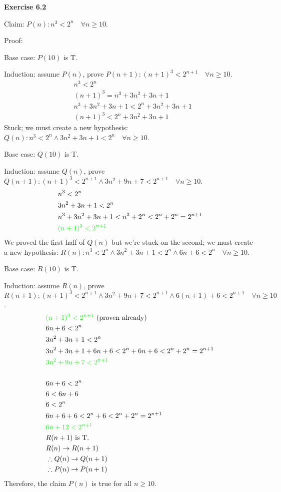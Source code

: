 \documentclass[fleqn]{article}
\begin{document}
\newpage
{\noindent\Large\bf Exercise 6.2}\vspace{1em}\par
Claim: $P(n): n^3 < 2^n\quad \forall n \geq 10$.\par
Proof:
\begin{addmargin}{2em}
	Base case: $P(10)$ is T.\par
	Induction: assume $P(n)$, prove $P(n+1): (n+1)^3 < 2^{n+1}\quad \forall n \geq 10$.
	\begin{align*}
		&n^3 < 2^n\\
		&(n+1)^3 = n^3+3n^2+3n+1\\
		&n^3+3n^2+3n+1 < 2^n+3n^2+3n+1\\
		&(n+1)^3 < 2^n+3n^2+3n+1
	\end{align*}
	Stuck; we must create a new hypothesis: $Q(n): n^3 < 2^n \land 3n^2+3n+1 < 2^n\quad \forall n \geq 10$.\par
	Base case: $Q(10)$ is T.\par
	Induction: assume $Q(n)$, prove $Q(n+1): (n+1)^3 < 2^{n+1} \land 3n^2+9n+7 < 2^{n+1}\quad \forall n \geq 10$.
	\begin{align*}
		&n^3 < 2^n\\
		&3n^2+3n+1 < 2^n\\
		&n^3+3n^2+3n+1 < n^3+2^n < 2^n+2^n = 2^{n+1}\\
		&{\color{green}(n+1)^3 < 2^{n+1}}
	\end{align*}
	We proved the first half of $Q(n)$ but we're stuck on the second; we must create a new hypothesis: $R(n): n^3 < 2^n \land 3n^2+3n+1 < 2^n \land 6n+6 < 2^n\quad \forall n \geq 10$.\par
	Base case: $R(10)$ is T.\par
	Induction: assume $R(n)$, prove $R(n+1): (n+1)^3 < 2^{n+1} \land 3n^2+9n+7 < 2^{n+1} \land 6(n+1)+6 < 2^{n+1}\quad \forall n \geq 10$.
	\begin{align*}
		&{\color{green}(n+1)^3 < 2^{n+1}} \text{ (proven already)}\\
		&6n+6 < 2^n\\
		&3n^2+3n+1 < 2^n\\
		&3n^2+3n+1+6n+6 < 2^n+6n+6 < 2^n+2^n = 2^{n+1}\\
		&{\color{green}3n^2+9n+7 < 2^{n+1}}\\\\
		&6n+6 < 2^n\\
		&6 < 6n+6\\
		&6 < 2^n\\
		&6n+6+6 < 2^n+6 < 2^n+2^n = 2^{n+1}\\
		&{\color{green}6n+12 < 2^{n+1}}\\
		&R(n+1) \text{ is T.}\\
		&R(n) \rightarrow R(n+1)\\
		&\therefore Q(n) \rightarrow Q(n+1)\\
		&\therefore P(n) \rightarrow P(n+1)
	\end{align*}
	Therefore, the claim $P(n)$ is true for all $n \geq 10$.
\end{addmargin}
\end{document}
